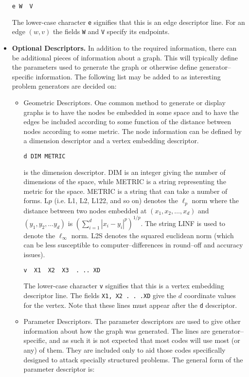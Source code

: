 \begin{itemize}
\begin{verbatim}
e W  V 
\end{verbatim} 
The lower-case character {\tt e} signifies that this is an 
edge descriptor line.  For an edge $(w,v)$ the fields {\tt W}  and 
{\tt V} specify its endpoints.  

\item {\bf Optional Descriptors.}  In addition to the required
information, there can be additional pieces of information about a
graph.  This will typically define the parameters used to generate the
graph or otherwise define generator--specific information.  The
following list may be added to as interesting problem generators are
decided on:

\begin{itemize}
\item{Geometric Descriptors.}  One common method to generate or display
graphs is to have the nodes be embedded in some space and to have the
edges be included according to some function of the distance between
nodes according to some metric.  The node information can be defined
by a dimension descriptor and a vertex embedding descriptor.

\begin{verbatim}
d DIM METRIC
\end{verbatim}

\noindent is the dimension descriptor.  DIM is an integer giving the
number of dimensions of the space, while METRIC is a string
representing the metric for the space.  METRIC is a string that can
take a number of forms.  L$p$ (i.e. L1, L2, L122, and so on) denotes
the $\ell_p$ norm where the distance between two nodes embedded at
$(x_1,x_2,\ldots,x_d)$ and $(y_1,y_2,\ldots y_d)$ is $(\sum_{i=1}^d
|x_i-y_i|^p)^{1/p}$.  The string LINF is used to denote the
$\ell_\infty$ norm.  L2S denotes the squared euclidean norm (which can
be less susceptible to computer--differences in round--off and
accuracy issues).

\begin{verbatim}
v  X1  X2  X3  . .. XD
\end{verbatim} 
The lower-case character {\tt v} signifies that this is a vertex
embedding descriptor line.  The fields {\tt X1, X2 . . .XD} give the
$d$ coordinate values for the vertex.  Note that these lines must
appear after the {\tt d} descriptor.

\item{Parameter Descriptors.}  The parameter descriptors are used to
give other information about how the graph was generated.  The lines
are generator--specific, and as such it is not expected that most
codes will use most (or any) of them.  They are included only to aid
those codes specifically designed to attack specially structured
problems.  The general form of the parameter descriptor is:


\end{itemize}
\end{itemize}
